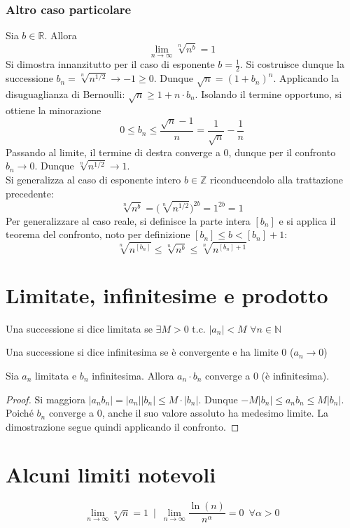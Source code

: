 \documentclass[10pt, oneside]{book}
\theoremstyle{plain}
\begin{document}
\subsubsection{Altro caso particolare}
Sia $b \in \mathbb{R}$. Allora
\[\lim \limits_{n \rightarrow \infty} \sqrt[n]{n^b} = 1\]
Si dimostra innanzitutto per il caso di esponente $b = \frac{1}{2}$. Si costruisce dunque la successione $b_n = \sqrt[n]{n^{1/2}} \rightarrow - 1 \geq 0$. Dunque $\sqrt{n} = (1 + b_n)^n$. Applicando la disuguaglianza di Bernoulli: $\sqrt{n} \geq 1 + n \cdot b_n$. Isolando il termine opportuno, si ottiene la minorazione
\[0 \leq b_n \leq \frac{\sqrt{n} - 1}{n} = \frac{1}{\sqrt{n}} - \frac{1}{n}\]
Passando al limite, il termine di destra converge a 0, dunque per il confronto $b_n \rightarrow 0$. Dunque $\sqrt[n]{n^{1/2}} \rightarrow 1$.
\\Si generalizza al caso di esponente intero $b \in \mathbb{Z}$ riconducendolo alla trattazione precedente:
\[\sqrt[n]{n^b} = \big(\sqrt[n]{n^{1/2}}\big)^{2b} = 1^{2b} = 1\]
Per generalizzare al caso reale, si definisce la parte intera $[b_n]$ e si applica il teorema del confronto, noto per definizione $[b_n] \leq b < [b_n] + 1$:
\[\sqrt[n]{n^{[b_n]}} \leq \sqrt[n]{n^b}\leq \sqrt[n]{n^{[b_n] + 1}}\]

\section{Limitate, infinitesime e prodotto}
\begin{defin}
    Una successione si dice limitata se $\exists M > 0$ t.c. $|a_n| < M$ $\forall n \in \mathbb{N}$
\end{defin}
\begin{defin}
    Una successione si dice infinitesima se è convergente e ha limite 0 ($a_n \rightarrow 0$)
\end{defin}
\begin{ther}
    Sia $a_n$ limitata e $b_n$ infinitesima. Allora $a_n \cdot b_n$ converge a 0 (è infinitesima).
\end{ther}
\begin{proof}
    Si maggiora $|a_n b_n| = |a_n| |b_n| \leq M \cdot |b_n|$. Dunque $- M |b_n| \leq a_n b_n \leq M |b_n|$. Poiché $b_n$ converge a 0, anche il suo valore assoluto ha medesimo limite. La dimostrazione segue quindi applicando il confronto.
\end{proof}

\section{Alcuni limiti notevoli}
\[\lim \limits_{n \rightarrow \infty} \sqrt[n]{n} = 1 \enspace \bigg| \enspace \lim \limits_{n \rightarrow \infty} \frac{\ln(n)}{n^\alpha} = 0 \enspace \forall \alpha > 0\]
\end{document}
